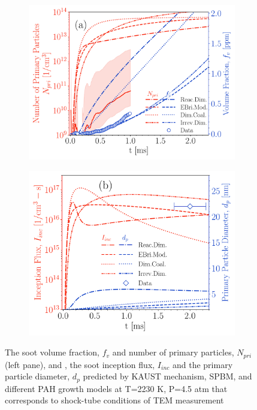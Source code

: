\begin{figure}[H]
	\centering
	\begin{subfigure}[t]{0.42\textwidth}
		\includegraphics[width=1\textwidth]{Figures/Results/Shocktube/Stanford/TEM/10CH4_TEM_Nprivf.pdf}
	\end{subfigure}
	\begin{subfigure}[t]{0.39\textwidth}
		\includegraphics[width=1\textwidth]{Figures/Results/Shocktube/Stanford/TEM/10CH4_TEM_Iincdp.pdf}
	\end{subfigure}
	\caption{The soot volume fraction, $f_v$ and number of primary particles, $N_{pri}$ (left pane), and , the soot inception flux, $I_{inc}$ and the primary particle diameter, $d_p$ predicted by KAUST mechanism, SPBM, and different PAH growth models at T=2230 K, P=4.5 atm that corresponds to shock-tube conditions of TEM measurement}
	\label{fig:shocktube_TEM_10ch4_fvNpriIincdp} 
\end{figure}


